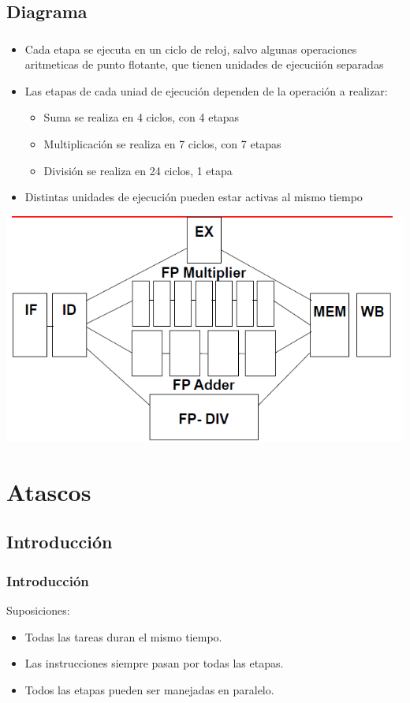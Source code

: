 \documentclass{beamer}
\begin{document}
\subsection{Diagrama}
\begin{frame}
\frametitle{}
\begin{itemize}
\item Cada etapa se ejecuta en un ciclo de reloj, salvo algunas operaciones aritmeticas de punto flotante, que tienen unidades de ejecuciión separadas
\item Las etapas de cada uniad de ejecución dependen de la operación a realizar:
\begin{itemize}
\item Suma se realiza en 4 ciclos, con 4 etapas
\item Multiplicación se realiza en 7 ciclos, con 7 etapas
\item División se realiza en 24 ciclos, 1 etapa
\end{itemize}
\item Distintas unidades de ejecución pueden estar activas al mismo tiempo
\end{itemize}
\includegraphics[scale=0.35]{ciclo-instruccion.png}
\end{frame}

\section{Atascos}

\subsection{Introducción}
\begin{frame}
\frametitle{Introducción}
Suposiciones:
\begin{itemize}
\item Todas las tareas duran el mismo tiempo.
\item Las instrucciones siempre pasan por todas las etapas.
\item Todos las etapas pueden ser manejadas en paralelo.
\end{itemize}
\end{frame}
\end{document}
